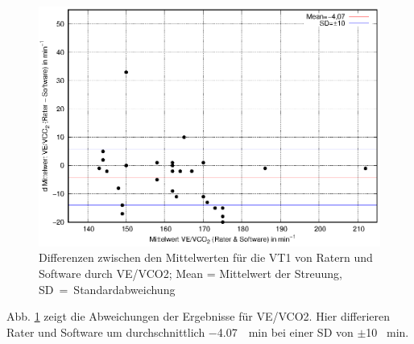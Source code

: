 \begin{figure}[H]
	\centering
	\includegraphics[scale=0.95]{Bilder/vevco2.eps}
	\caption[Differenzen der \acrshort{VE}/\acrshort{VCO2}-Ergebnisse zwischen Ratern und Software]{Differenzen zwischen den Mittelwerten für die VT1 von Ratern und Software durch \acrshort{VE}/\acrshort{VCO2}; Mean = Mittelwert der Streuung, SD~=~Standardabweichung}
	\label{pic:pic27}
\end{figure}
%
Abb. \ref{pic:pic27} zeigt die Abweichungen der Ergebnisse für \gls{VE}/\gls{VCO2}. Hier differieren Rater und Software um durchschnittlich \SI{-4,07}{\per\minute} bei einer \gls{SD} von $\pm$10 \si{\per\minute}.

\cleardoubleemptypage